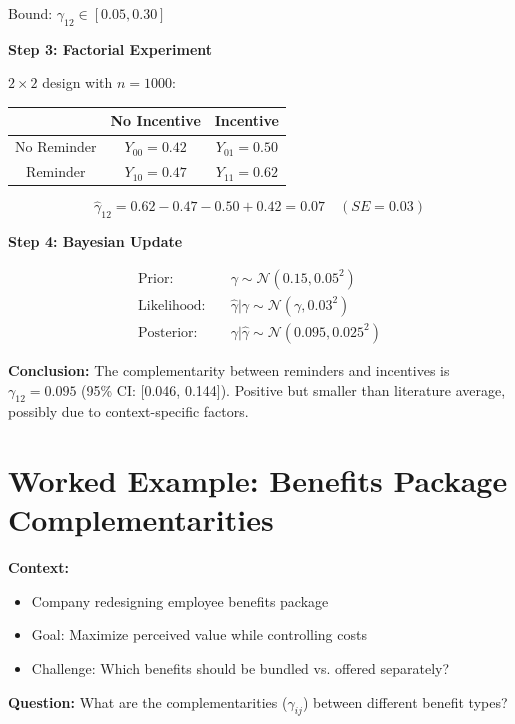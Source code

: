 Bound: $\gamma_{12} \in [0.05, 0.30]$

\textbf{Step 3: Factorial Experiment}

$2 \times 2$ design with $n = 1000$:
\begin{center}
\begin{tabular}{c|cc}
& No Incentive & Incentive \\
\hline
No Reminder & $Y_{00} = 0.42$ & $Y_{01} = 0.50$ \\
Reminder & $Y_{10} = 0.47$ & $Y_{11} = 0.62$
\end{tabular}
\end{center}

\begin{equation}
\hat{\gamma}_{12} = 0.62 - 0.47 - 0.50 + 0.42 = 0.07 \quad (SE = 0.03)
\end{equation}

\textbf{Step 4: Bayesian Update}

\begin{align}
\text{Prior:} & \quad \gamma \sim \mathcal{N}(0.15, 0.05^2) \\
\text{Likelihood:} & \quad \hat{\gamma} | \gamma \sim \mathcal{N}(\gamma, 0.03^2) \\
\text{Posterior:} & \quad \gamma | \hat{\gamma} \sim \mathcal{N}(0.095, 0.025^2)
\end{align}

\textbf{Conclusion:} The complementarity between reminders and incentives is $\gamma_{12} = 0.095$ (95\% CI: [0.046, 0.144]). Positive but smaller than literature average, possibly due to context-specific factors.


\section{Worked Example: Benefits Package Complementarities}
\label{sec:worked-example-benefits}

\begin{tcolorbox}[colback=blue!5!white,colframe=blue!75!black,title=\textbf{Case: HR Benefits Portfolio Design}]
\textbf{Context:}
\begin{itemize}[noitemsep]
    \item Company redesigning employee benefits package
    \item Goal: Maximize perceived value while controlling costs
    \item Challenge: Which benefits should be bundled vs. offered separately?
\end{itemize}

\textbf{Question:} What are the complementarities ($\gamma_{ij}$) between different benefit types?
\end{tcolorbox}

